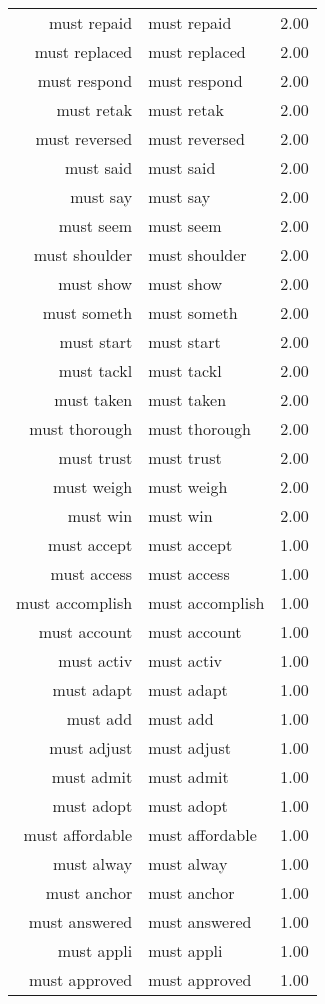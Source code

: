 \begin{table}[ht]
\begin{tabular}{rlr}
  must repaid & must repaid & 2.00 \\ 
  must replaced & must replaced & 2.00 \\ 
  must respond & must respond & 2.00 \\ 
  must retak & must retak & 2.00 \\ 
  must reversed & must reversed & 2.00 \\ 
  must said & must said & 2.00 \\ 
  must say & must say & 2.00 \\ 
  must seem & must seem & 2.00 \\ 
  must shoulder & must shoulder & 2.00 \\ 
  must show & must show & 2.00 \\ 
  must someth & must someth & 2.00 \\ 
  must start & must start & 2.00 \\ 
  must tackl & must tackl & 2.00 \\ 
  must taken & must taken & 2.00 \\ 
  must thorough & must thorough & 2.00 \\ 
  must trust & must trust & 2.00 \\ 
  must weigh & must weigh & 2.00 \\ 
  must win & must win & 2.00 \\ 
  must accept & must accept & 1.00 \\ 
  must access & must access & 1.00 \\ 
  must accomplish & must accomplish & 1.00 \\ 
  must account & must account & 1.00 \\ 
  must activ & must activ & 1.00 \\ 
  must adapt & must adapt & 1.00 \\ 
  must add & must add & 1.00 \\ 
  must adjust & must adjust & 1.00 \\ 
  must admit & must admit & 1.00 \\ 
  must adopt & must adopt & 1.00 \\ 
  must affordable & must affordable & 1.00 \\ 
  must alway & must alway & 1.00 \\ 
  must anchor & must anchor & 1.00 \\ 
  must answered & must answered & 1.00 \\ 
  must appli & must appli & 1.00 \\ 
  must approved & must approved & 1.00 \\ 

\end{tabular}
\end{table}
